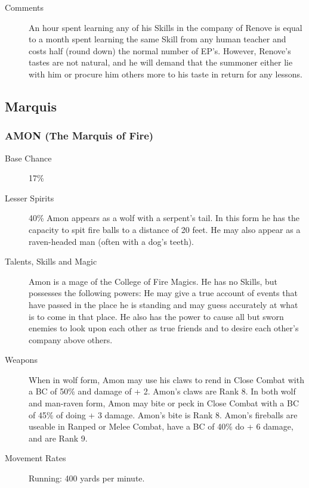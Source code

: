 \begin{multicols}{2}
\begin{description}
\item[Comments] An hour spent learning any of his Skills in the company of
Renove is equal to a month spent learning the same Skill from any
human teacher and costs half (round down) the normal number of
EP's. However, Renove's tastes are not natural, and he will demand
that the summoner either lie with him or procure him others more to
his taste in return for any lessons.

\end{description}

\subsection{Marquis}

\subsubsection{AMON (The Marquis of Fire)}

\begin{description}

\item[Base Chance] 17\%

\item[Lesser Spirits]40\% Amon appears as a wolf with a serpent's tail.  In this
form he has the capacity to spit fire balls to a distance of 20 feet.
He may also appear as a raven-headed man (often with a dog's teeth).

\item[Talents, Skills and Magic] Amon is a mage of the College of Fire Magics.  He has no
Skills, but possesses the following powers: He may give a true account
of events that have passed in the place he is standing and may guess
accurately at what is to come in that place.  He also has the power to
cause all but sworn enemies to look upon each other as true friends
and to desire each other's company above others.

\item[Weapons] When in wolf form, Amon may use his claws to rend in Close
Combat with a BC of 50\% and damage of + 2.  Amon's claws are
Rank 8.  In both wolf and man-raven form, Amon may bite or peck in
Close Combat with a BC of 45\% of doing + 3 damage.  Amon's bite
is Rank 8.  Amon's fireballs are useable in Ranped or Melee Combat,
have a BC of 40\% do + 6 damage, and are Rank 9.

\item[Movement Rates] Running: 400 yards per minute.


\end{description}
\end{multicols}
